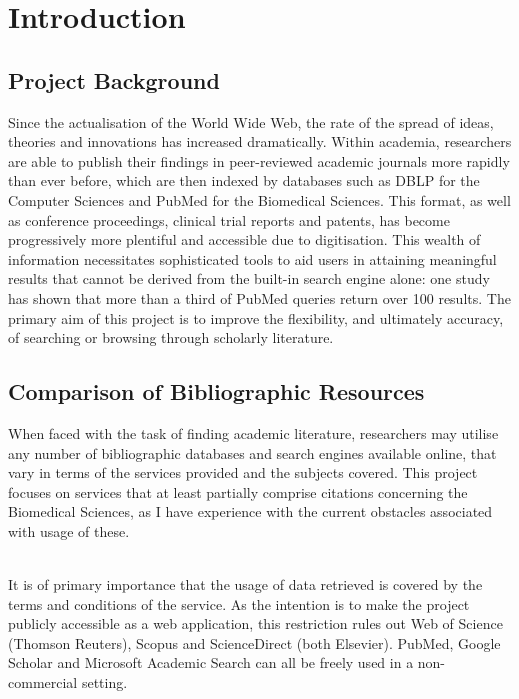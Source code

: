 \documentclass[PROP_AGutteridge_CS.tex]{subfiles}
\begin{document}
\chapter{Introduction}
\section{Project Background}
Since the actualisation of the World Wide Web, the rate of the spread of ideas, theories and innovations has increased dramatically. Within academia, researchers are able to publish their findings in peer-reviewed academic journals more rapidly than ever before, which are then indexed by databases such as DBLP for the Computer Sciences and PubMed for the Biomedical Sciences. This format, as well as conference proceedings, clinical trial reports and patents, has become progressively more plentiful and accessible due to digitisation. This wealth of information necessitates sophisticated tools to aid users in attaining meaningful results that cannot be derived from the built-in search engine alone: one study has shown that more than a third of PubMed queries return over 100 results\cite{dogan}. The primary aim of this project is to improve the flexibility, and ultimately accuracy, of searching or browsing through scholarly literature. 

\section{Comparison of Bibliographic Resources}
When faced with the task of finding academic literature, researchers may utilise any number of bibliographic databases and search engines available online, that vary in terms of the services provided and the subjects covered. This project focuses on services that at least partially comprise citations concerning the Biomedical Sciences, as I have experience with the current obstacles associated with usage of these.

\noindent \\ It is of primary importance that the usage of data retrieved is covered by the terms and conditions of the service. As the intention is to make the project publicly accessible as a web application, this restriction rules out Web of Science (Thomson Reuters), Scopus and ScienceDirect (both Elsevier). PubMed, Google Scholar and Microsoft Academic Search can all be freely used in a non-commercial setting.
\end{document}
